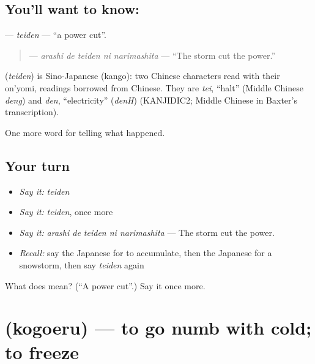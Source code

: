 \subsection*{You'll want to know: }
\textbf{} — \emph{teiden} — \textquotedblleft{}a power cut\textquotedblright{}.

\begin{quote}
\textbf{  } — \emph{arashi de teiden ni narimashita} — \textquotedblleft{}The storm cut the power.\textquotedblright{}
\end{quote}

\begin{cousinweb}
\textbf{} (\emph{teiden}) is Sino-Japanese (kango): two Chinese characters read with their on'yomi, readings borrowed from Chinese. They are \emph{tei}, \textquotedblleft{}halt\textquotedblright{} (Middle Chinese \emph{deng}) and \emph{den}, \textquotedblleft{}electricity\textquotedblright{} (\emph{denH}) (KANJIDIC2; Middle Chinese in Baxter's transcription).
\end{cousinweb}

\begin{grammarlens}[title={What you've built}]
One more word for telling what happened.
\end{grammarlens}

\subsection*{Your turn}
\begin{itemize}
\raggedright
  \item \emph{Say it:} \emph{teiden}
  \item \emph{Say it:} \emph{teiden}, once more
  \item \emph{Say it:} \emph{arashi de teiden ni narimashita} — The storm cut the power.
  \item \emph{Recall:} say the Japanese for to accumulate, then the Japanese for a snowstorm, then say \emph{teiden} again
\end{itemize}

\begin{tcolorbox}[breakable,colback=teal!4,colframe=teal!35!black,title={Before you move on}]
What does  mean? (\textquotedblleft{}A power cut\textquotedblright{}.) Say it once more.
\end{tcolorbox}
\section[\texorpdfstring{\ja{こごえる} (kogoeru)}{こごえる (kogoeru)}]{ (kogoeru) — to go numb with cold; to freeze}

